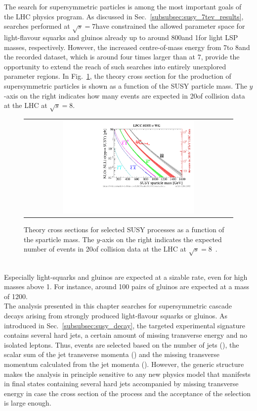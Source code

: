 The search for supersymmetric particles is among the most important goals of the LHC physics program. As discussed in Sec.~\ref{subsubsec:susy_7tev_results}, searches performed at $\sqrt{s} = 7$\tev have constrained the allowed parameter space for light-flavour squarks and gluinos already up to around 800\gev and 1\tev for light LSP masses, respectively. However, the increased centre-of-mass energy from 7\tev to 8\tev and the recorded dataset, which is around four times larger than at 7\tev, provide the opportunity to extend the reach of such searches into entirely unexplored parameter regions. In Fig.~\ref{fig:susy_theory_xs}, the theory cross section for the production of supersymmetric particles is shown as a function of the SUSY particle mass. The $y$-axis on the right indicates how many events are expected in 20\fbinv of \pp collision data at the LHC at $\sqrt{s}=8$\tev. 
\begin{figure}[!h]
  \centering
  \begin{tabular}{c}
                \includegraphics[width=0.65\textwidth]{figures/xsections_strong.pdf} 
  \end{tabular}
  \caption{Theory cross sections for selected SUSY processes as a function of the sparticle mass. The $y$-axis on the right indicates the expected number of events in 20\fbinv of \pp collision data at the LHC at $\sqrt{s}=8$\tev~\cite{Kramer:2012bx}.}
  \label{fig:susy_theory_xs}
\end{figure}
\\
Especially light-squarks and gluinos are expected at a sizable rate, even for high masses above 1\tev. For instance, around 100 pairs of gluinos are expected at a mass of 1200\gev. \\
The analysis presented in this chapter searches for supersymmetric cascade decays arising from strongly produced light-flavour squarks or gluinos. As introduced in Sec.~\ref{subsubsec:susy_decay}, the targeted experimental signature contains several hard jets, a certain amount of missing transverse energy and no isolated leptons. Thus, events are selected based on the number of jets (\NJets), the scalar sum of the jet transverse momenta (\HT) and the missing transverse momentum calculated from the jet momenta (\MHT). However, the generic structure makes the analysis in principle sensitive to any new physics model that manifests in final states containing several hard jets accompanied by missing transverse energy in case the cross section of the process and the acceptance of the selection is large enough. \\
